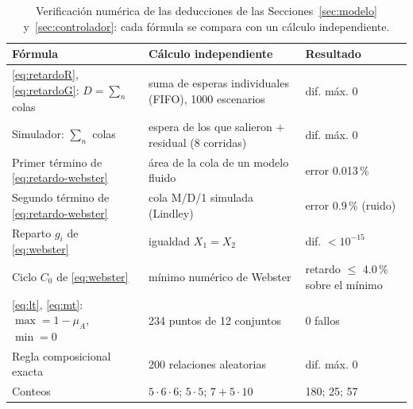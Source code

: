 \begin{table}[!t]
\caption{Verificación numérica de las deducciones de las Secciones~\ref{sec:modelo} y~\ref{sec:controlador}: cada fórmula se compara con un cálculo independiente.}
\label{tab:verificacion}
\centering
\scriptsize
\setlength{\tabcolsep}{2.4pt}
\begin{tabular}{@{}p{}p{}p{}@{}}
\toprule
Fórmula & Cálculo independiente & Resultado \\
\midrule
\eqref{eq:retardoR}, \eqref{eq:retardoG}: $D=\sum_n$ colas & suma de esperas individuales (FIFO), 1000 escenarios & dif. máx. 0 \\
Simulador: $\sum_n$ colas & espera de los que salieron $+$ residual (8 corridas) & dif. máx. 0 \\
Primer término de \eqref{eq:retardo-webster} & área de la cola de un modelo fluido & error 0.013\,\% \\
Segundo término de \eqref{eq:retardo-webster} & cola M/D/1 simulada (Lindley) & error 0.9\,\% (ruido) \\
Reparto $g_i$ de \eqref{eq:webster} & igualdad $X_1=X_2$ & dif. $<10^{-15}$ \\
Ciclo $C_0$ de \eqref{eq:webster} & mínimo numérico de Webster & retardo $\le$ 4.0\,\% sobre el mínimo \\
\eqref{eq:lt}, \eqref{eq:mt}: $\max=1-\mu_A$, $\min=0$ & 234 puntos de 12 conjuntos & 0 fallos \\
Regla composicional exacta & 200 relaciones aleatorias & dif. máx. 0 \\
Conteos & $5\cdot6\cdot6$; $5\cdot5$; $7+5\cdot10$ & 180; 25; 57 \\
\bottomrule
\end{tabular}
\end{table}
